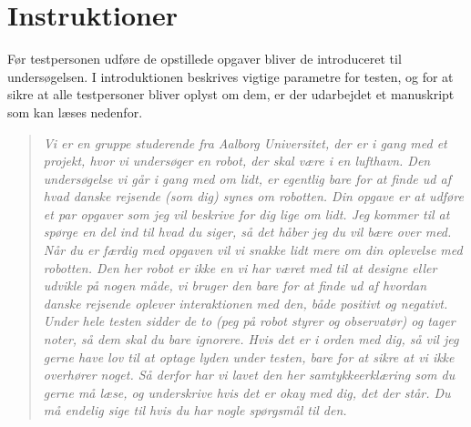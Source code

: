 \section{Instruktioner}
\label{ParametreInstruktioner}
%

Før testpersonen udføre de opstillede opgaver bliver de introduceret til undersøgelsen. I introduktionen beskrives vigtige parametre for testen, og for at sikre at alle testpersoner bliver oplyst om dem, er der udarbejdet et manuskript som kan læses nedenfor.\blankline 
%
\begin{quotation}
\noindent
\textit{Vi er en gruppe studerende fra Aalborg Universitet, der er i gang med et projekt, hvor vi undersøger en robot, der skal være i en lufthavn. Den undersøgelse vi går i gang med om lidt, er egentlig bare for at finde ud af hvad danske rejsende (som dig) synes om robotten.\blankline
%
Din opgave er at udføre et par opgaver som jeg vil beskrive for dig lige om lidt. Jeg kommer til at spørge en del ind til hvad du siger, så det håber jeg du vil bære over med. Når du er færdig med opgaven vil vi snakke lidt mere om din oplevelse med robotten.\blankline  
%
Den her robot er ikke en vi har været med til at designe eller udvikle på nogen måde, vi bruger den bare for at finde ud af hvordan danske rejsende oplever interaktionen med den, både positivt og negativt.\blankline
%
Under hele testen sidder de to (peg på robot styrer og observatør) og tager noter, så dem skal du bare ignorere. \blankline
%
Hvis det er i orden med dig, så vil jeg gerne have lov til at optage lyden under testen, bare for at sikre at vi ikke overhører noget. Så derfor har vi lavet den her samtykkeerklæring som du gerne må læse, og underskrive hvis det er okay med dig, det der står. Du må endelig sige til hvis du har nogle spørgsmål til den.}
\end{quotation}
